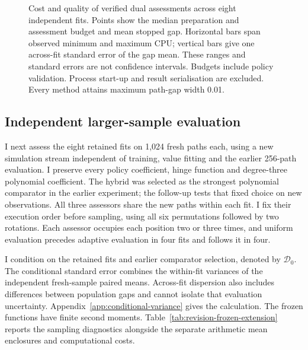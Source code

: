 \documentclass[11pt]{article}
\begin{document}
\begin{figure}[!htb]
\caption{Cost and quality of verified dual assessments across eight independent fits. Points show the median preparation and assessment budget and mean stopped gap. Horizontal bars span observed minimum and maximum CPU; vertical bars give one across-fit standard error of the gap mean. These ranges and standard errors are not confidence intervals. Budgets include policy validation. Process start-up and result serialisation are excluded. Every method attains maximum path-gap width 0.01.}
\label{fig:revision-replicated-tradeoff}
\end{figure}

\subsection{Independent larger-sample evaluation}

I next assess the eight retained fits on 1,024 fresh paths each, using a new simulation stream independent of training, value fitting and the earlier 256-path evaluation. I preserve every policy coefficient, hinge function and degree-three polynomial coefficient. The hybrid was selected as the strongest polynomial comparator in the earlier experiment; the follow-up tests that fixed choice on new observations. All three assessors share the new paths within each fit. I fix their execution order before sampling, using all six permutations followed by two rotations. Each assessor occupies each position two or three times, and uniform evaluation precedes adaptive evaluation in four fits and follows it in four.

I condition on the retained fits and earlier comparator selection, denoted by $\mathcal D_0$. The conditional standard error combines the within-fit variances of the independent fresh-sample paired means. Across-fit dispersion also includes differences between population gaps and cannot isolate that evaluation uncertainty. Appendix~\ref{app:conditional-variance} gives the calculation. The frozen functions have finite second moments. Table~\ref{tab:revision-frozen-extension} reports the sampling diagnostics alongside the separate arithmetic mean enclosures and computational costs.
\end{document}
